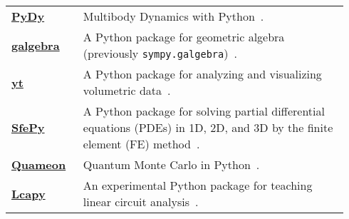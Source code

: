\begin{longtable}[htbc]{>{\raggedright}p{0.2\linewidth}p{0.74\linewidth}}
\href{http://www.pydy.org/}{\textbf{PyDy}} & Multibody Dynamics with
  Python~\cite{gede2013constrained}. \\

\href{https://github.com/brombo/galgebra}{\textbf{galgebra}} &
  A Python package for geometric algebra (previously \texttt{sympy.galgebra})~\cite{galgebra}. \\

\href{http://yt-project.org/}{\textbf{yt}} & A Python package for
  analyzing and visualizing volumetric data~\cite{2011ApJS..192....9T}. \\

\href{http://sfepy.org/}{\textbf{SfePy}} &
  A Python package for solving partial
  differential equations (PDEs) in 1D, 2D, and 3D by the finite element (FE)
  method~\cite{Zienkiewicz2013finite,cimrman2014sfepy}. \\

\href{http://quameon.sourceforge.net/}{\textbf{Quameon}} & Quantum
  Monte Carlo in Python~\cite{quameon}. \\

\href{http://lcapy.elec.canterbury.ac.nz/}{\textbf{Lcapy}} &
  An experimental Python package for teaching linear circuit analysis~\cite{lcapy}. \\
\bottomrule
\end{longtable}
